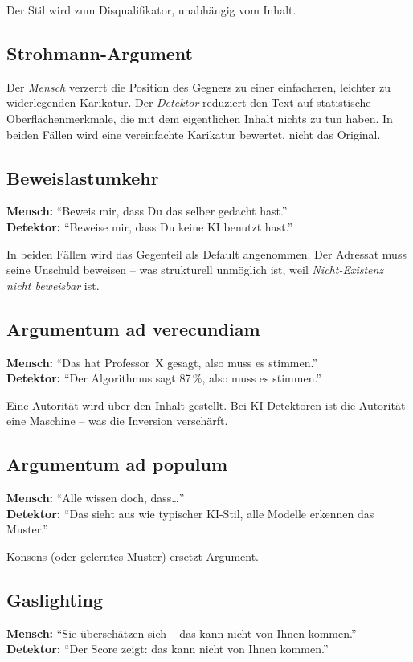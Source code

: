 Der Stil wird zum Disqualifikator, unabhängig vom Inhalt.

\subsection{Strohmann-Argument}
Der \emph{Mensch} verzerrt die Position des Gegners zu einer
einfacheren, leichter zu widerlegenden Karikatur. Der \emph{Detektor}
reduziert den Text auf statistische Oberflächenmerkmale, die mit
dem eigentlichen Inhalt nichts zu tun haben. In beiden Fällen wird
eine vereinfachte Karikatur bewertet, nicht das Original.

\subsection{Beweislastumkehr}
\textbf{Mensch:} \enquote{Beweis mir, dass Du das selber gedacht
hast.}\\
\textbf{Detektor:} \enquote{Beweise mir, dass Du keine KI benutzt
hast.}

In beiden Fällen wird das Gegenteil als Default angenommen. Der
Adressat muss seine Unschuld beweisen -- was strukturell unmöglich
ist, weil \emph{Nicht-Existenz nicht beweisbar} ist.

\subsection{Argumentum ad verecundiam}
\textbf{Mensch:} \enquote{Das hat Professor~X gesagt, also muss es
stimmen.}\\
\textbf{Detektor:} \enquote{Der Algorithmus sagt 87\,\%, also muss
es stimmen.}

Eine Autorität wird über den Inhalt gestellt. Bei KI-Detektoren ist
die Autorität eine Maschine -- was die Inversion verschärft.

\subsection{Argumentum ad populum}
\textbf{Mensch:} \enquote{Alle wissen doch, dass\ldots}\\
\textbf{Detektor:} \enquote{Das sieht aus wie typischer KI-Stil,
alle Modelle erkennen das Muster.}

Konsens (oder gelerntes Muster) ersetzt Argument.

\subsection{Gaslighting}
\textbf{Mensch:} \enquote{Sie überschätzen sich -- das kann nicht
von Ihnen kommen.}\\
\textbf{Detektor:} \enquote{Der Score zeigt: das kann nicht von
Ihnen kommen.}

